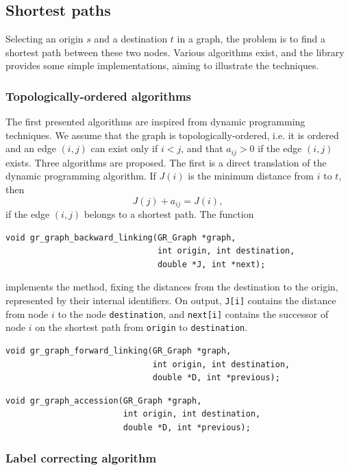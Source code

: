 \subsection{Shortest paths}

Selecting an origin $s$ and a destination $t$ in a graph, the problem is to find a shortest path
between these two nodes.
Various algorithms exist, and the library provides some simple implementations, aiming to
illustrate the techniques.

\subsubsection{Topologically-ordered algorithms}

The first presented algorithms are inspired from dynamic programming techniques.
We assume that the graph is topologically-ordered, i.e. it is ordered and an edge $(i,j)$
can exist only if $i < j$, and that $a_{ij} > 0$ if the edge $(i,j)$ exists.
Three algorithms are proposed.
The first is a direct translation of the dynamic programming algorithm.
If $J(i)$ is the minimum distance from $i$ to $t$, then
\[
 J(j) + a_{ij} = J(i),
\]
if the edge $(i,j)$ belongs to a shortest path.
The function
\begin{verbatim}
void gr_graph_backward_linking(GR_Graph *graph,
                               int origin, int destination,
                               double *J, int *next);
\end{verbatim}
implements the method, fixing the distances from the destination to the origin, represented by their internal identifiers.
On output, \verb|J[i]| contains the distance from node $i$ to the node \verb|destination|,
and \verb|next[i]| contains the successor of node $i$ on the shortest path from
\verb|origin| to \verb|destination|.

\begin{verbatim}
void gr_graph_forward_linking(GR_Graph *graph,
                              int origin, int destination,
                              double *D, int *previous);
\end{verbatim}

\begin{verbatim}
void gr_graph_accession(GR_Graph *graph,
                        int origin, int destination,
                        double *D, int *previous);
\end{verbatim}

\subsubsection{Label correcting algorithm}

